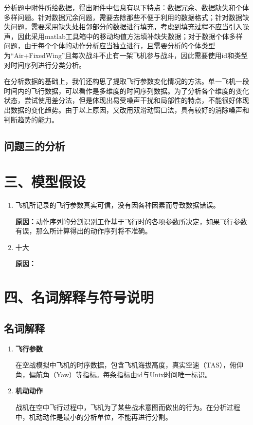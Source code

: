 \documentclass{my_paper}
\begin{document}
分析题中附件所给数据，得出附件中信息有以下特点：数据冗余、数据缺失和个体多样问题。针对数据冗余问题，需要去除那些不便于利用的数据格式；针对数据缺失问题，需要采用缺失处相邻部分的数据进行填充，考虑到填充过程不应当引入噪声，因此采用matlab工具箱中的移动均值方法填补缺失数据；对于数据个体多样问题，由于每个个体的动作分析应当独立进行，且需要分析的个体类型为“Air+FixedWing”且每次战斗不止有一架飞机参与战斗，因此需要使用id和类型对时间序列进行分类分析。

在分析数据的基础上，我们还构思了提取飞行参数变化情况的方法。单一飞机一段时间内的飞行数据，可以看作是多维度的时间序列数据。为了分析各个维度的变化状态，尝试使用差分法，但是体现出易受噪声干扰和局部性的特点，不能很好体现出数据的变化趋势。由于以上原因，又改用双滑动窗口法，具有较好的消除噪声和判断趋势的能力。

\subsection{问题三的分析}


\section{三、模型假设}
\begin{enumerate}
    \item 飞机所记录的飞行参数真实可信，没有因各种因素而导致数据错误。
    
    \textbf{原因：}动作序列的分割识别工作基于飞行时的各项参数所决定，如果飞行参数有误，那么所计算得出的动作序列将不准确。

    \item 十大
    
    \textbf{原因：}
    
\end{enumerate}

\section{四、名词解释与符号说明}
\subsection{名词解释}
\begin{enumerate}
    \item \textbf{飞行参数}
    
    在空战模拟中飞机的时序数据，包含飞机海拔高度，真实空速（TAS），俯仰角，偏航角（Yaw）等指标。每条指标由id与Unix时间唯一标识。
    
    \item \textbf{机动动作}
    
    战机在空中飞行过程中，飞机为了某些战术意图而做出的行为。在分析过程中，机动动作是最小的分析单位，不能再进行分割。

    
\end{enumerate}
\end{document}
